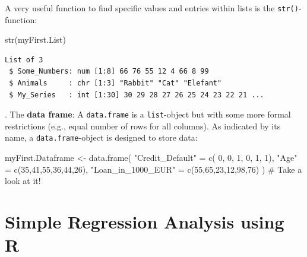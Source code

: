 \documentclass[
  letterpaper,
  DIV=11,
  numbers=noendperiod]{scrreprt}
\newenvironment{Shaded}{\begin{snugshade}}{\end{snugshade}}
\newcommand{\CommentTok}[1]{\textcolor[rgb]{0.37,0.37,0.37}{#1}}
\newcommand{\DecValTok}[1]{\textcolor[rgb]{0.68,0.00,0.00}{#1}}
\newcommand{\FunctionTok}[1]{\textcolor[rgb]{0.28,0.35,0.67}{#1}}
\newcommand{\NormalTok}[1]{\textcolor[rgb]{0.00,0.23,0.31}{#1}}
\newcommand{\OtherTok}[1]{\textcolor[rgb]{0.00,0.23,0.31}{#1}}
\newcommand{\StringTok}[1]{\textcolor[rgb]{0.13,0.47,0.30}{#1}}
\theoremstyle{definition}
\theoremstyle{plain}
\theoremstyle{plain}
\theoremstyle{remark}
\begin{document}
A very useful function to find specific values and entries within lists
is the \texttt{str()}-function:

\begin{Shaded}
\begin{Highlighting}[]
\FunctionTok{str}\NormalTok{(myFirst.List)}
\end{Highlighting}
\end{Shaded}

\begin{verbatim}
List of 3
 $ Some_Numbers: num [1:8] 66 76 55 12 4 66 8 99
 $ Animals     : chr [1:3] "Rabbit" "Cat" "Elefant"
 $ My_Series   : int [1:30] 30 29 28 27 26 25 24 23 22 21 ...
\end{verbatim}

\hfill\break
\hfill{}. The \textbf{data frame}: A \texttt{data.frame} is a
\texttt{list}-object but with some more formal restrictions (e.g., equal
number of rows for all columns). As indicated by its name, a
\texttt{data.frame}-object is designed to store data:

\begin{Shaded}
\begin{Highlighting}[]
\NormalTok{myFirst.Dataframe }\OtherTok{\textless{}{-}} \FunctionTok{data.frame}\NormalTok{(}
  \StringTok{"Credit\_Default"}   \OtherTok{=} \FunctionTok{c}\NormalTok{( }\DecValTok{0}\NormalTok{, }\DecValTok{0}\NormalTok{, }\DecValTok{1}\NormalTok{, }\DecValTok{0}\NormalTok{, }\DecValTok{1}\NormalTok{, }\DecValTok{1}\NormalTok{), }
  \StringTok{"Age"}              \OtherTok{=} \FunctionTok{c}\NormalTok{(}\DecValTok{35}\NormalTok{,}\DecValTok{41}\NormalTok{,}\DecValTok{55}\NormalTok{,}\DecValTok{36}\NormalTok{,}\DecValTok{44}\NormalTok{,}\DecValTok{26}\NormalTok{), }
  \StringTok{"Loan\_in\_1000\_EUR"} \OtherTok{=} \FunctionTok{c}\NormalTok{(}\DecValTok{55}\NormalTok{,}\DecValTok{65}\NormalTok{,}\DecValTok{23}\NormalTok{,}\DecValTok{12}\NormalTok{,}\DecValTok{98}\NormalTok{,}\DecValTok{76}\NormalTok{)}
\NormalTok{) }
\CommentTok{\# Take a look at it!}
\end{Highlighting}
\end{Shaded}

\hfill\break

\hypertarget{simple-regression-analysis-using-r}{%
\section{Simple Regression Analysis using
R}\label{simple-regression-analysis-using-r}}
\end{document}
